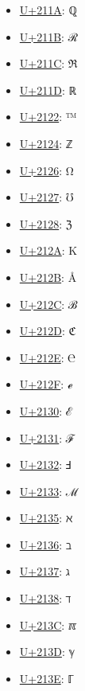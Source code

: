 \begin{itemize}
	\item \href{https://decodeunicode.org/en/u+211A}{U+211A}: ℚ
	\item \href{https://decodeunicode.org/en/u+211B}{U+211B}: ℛ
	\item \href{https://decodeunicode.org/en/u+211C}{U+211C}: ℜ
	\item \href{https://decodeunicode.org/en/u+211D}{U+211D}: ℝ
	\item \href{https://decodeunicode.org/en/u+2122}{U+2122}: ™
	\item \href{https://decodeunicode.org/en/u+2124}{U+2124}: ℤ
	\item \href{https://decodeunicode.org/en/u+2126}{U+2126}: Ω
	\item \href{https://decodeunicode.org/en/u+2127}{U+2127}: ℧
	\item \href{https://decodeunicode.org/en/u+2128}{U+2128}: ℨ
	\item \href{https://decodeunicode.org/en/u+212A}{U+212A}: K
	\item \href{https://decodeunicode.org/en/u+212B}{U+212B}: Å
	\item \href{https://decodeunicode.org/en/u+212C}{U+212C}: ℬ
	\item \href{https://decodeunicode.org/en/u+212D}{U+212D}: ℭ
	\item \href{https://decodeunicode.org/en/u+212E}{U+212E}: ℮
	\item \href{https://decodeunicode.org/en/u+212F}{U+212F}: ℯ
	\item \href{https://decodeunicode.org/en/u+2130}{U+2130}: ℰ
	\item \href{https://decodeunicode.org/en/u+2131}{U+2131}: ℱ
	\item \href{https://decodeunicode.org/en/u+2132}{U+2132}: Ⅎ
	\item \href{https://decodeunicode.org/en/u+2133}{U+2133}: ℳ
	\item \href{https://decodeunicode.org/en/u+2135}{U+2135}: ℵ
	\item \href{https://decodeunicode.org/en/u+2136}{U+2136}: ℶ
	\item \href{https://decodeunicode.org/en/u+2137}{U+2137}: ℷ
	\item \href{https://decodeunicode.org/en/u+2138}{U+2138}: ℸ
	\item \href{https://decodeunicode.org/en/u+213C}{U+213C}: ℼ
	\item \href{https://decodeunicode.org/en/u+213D}{U+213D}: ℽ
	\item \href{https://decodeunicode.org/en/u+213E}{U+213E}: ℾ

\end{itemize}
